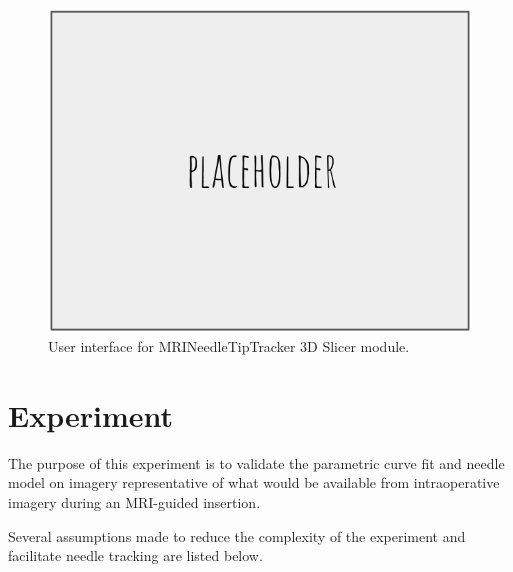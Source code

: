 \begin{figure}[h]
\includegraphics[width=1.0\textwidth]{Fig/placeholder.png}
\caption{User interface for MRINeedleTipTracker 3D Slicer module.}
\label{fig:slicer_gui}
\end{figure}


\section{Experiment}

The purpose of this experiment is to validate the parametric curve fit and needle model on imagery representative of what would be available from intraoperative imagery during an MRI-guided insertion.

Several assumptions made to reduce the complexity of the experiment and facilitate needle tracking are listed below.

